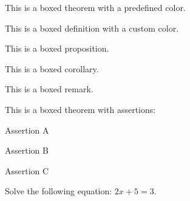 \documentclass{article}
\begin{document}
\begin{theorem}
    This is a boxed theorem with a predefined color.
    \end{theorem}
    
    \begin{definition}
    This is a boxed definition with a custom color.
    \end{definition}
    
    \begin{proposition}
    This is a boxed proposition.
    \end{proposition}
    
    \begin{corollary}
    This is a boxed corollary.
    \end{corollary}
    \begin{remark}
    This is a boxed remark.
    \end{remark}
    \begin{theorem}
        This is a boxed theorem with assertions:
        \begin{assertions}
            \item Assertion A
            \item Assertion B
            \item Assertion C
        \end{assertions}
    \end{theorem}
    \begin{exercise}
        Solve the following equation: \(2x+5=3\).
    \end{exercise}
\end{document}
